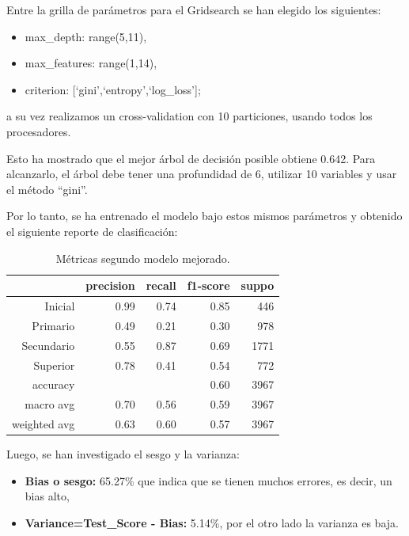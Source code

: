 \documentclass[a4paper]{article}
\begin{document}
            Entre la grilla de parámetros para el Gridsearch se han elegido los siguientes:
            \begin{itemize}
                \item max\_depth: range(5,11),
                \item max\_features: range(1,14),
                \item criterion: [`gini',`entropy',`log\_loss'];
            \end{itemize}
            a su vez realizamos un cross-validation con 10 particiones, usando todos los procesadores.
            
            Esto ha mostrado que el mejor árbol de decisión posible obtiene 0.642. Para alcanzarlo, el árbol debe tener una profundidad de  6, utilizar  10  variables y usar el método ``gini''.

            Por lo tanto, se ha entrenado el modelo bajo estos mismos parámetros y obtenido el siguiente reporte de clasificación:

            \begin{table}[H]
                \centering
                \begin{tabular}{rrrrr}
                    \toprule
                    ~ & precision & recall & f1-score & suppo \\ \midrule
                    Inicial    & 0.99 & 0.74 & 0.85 & 446 \\
                    Primario   & 0.49 & 0.21 & 0.30 & 978 \\
                    Secundario & 0.55 & 0.87 & 0.69 & 1771 \\
                    Superior   & 0.78 & 0.41 & 0.54 & 772 \\
                    accuracy & & & 0.60 & 3967 \\
                    macro avg & 0.70 & 0.56 & 0.59 & 3967 \\
                    weighted avg & 0.63 & 0.60 & 0.57 & 3967 \\
                    \bottomrule
                \end{tabular}
                \caption{Métricas segundo modelo mejorado.}
                \label{New Second model metrics}
            \end{table}

            Luego, se han investigado el sesgo y la varianza:
            \begin{itemize}
                \item \textbf{Bias o sesgo:} 65.27\% que indica que se tienen muchos errores, es decir, un bias alto,
                \item \textbf{Variance=Test\_Score - Bias:} 5.14\%, por el otro lado la varianza es baja.
            \end{itemize}
\end{document}
